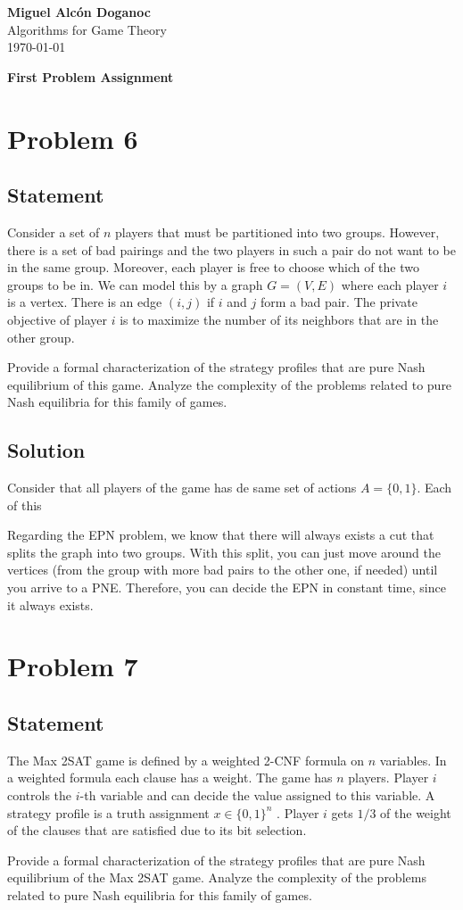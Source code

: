 \documentclass[a4paper, 10pt]{article}
\begin{document}
\noindent
\begin{flushright}
    \large\textbf{Miguel Alcón Doganoc} \\
    Algorithms for Game Theory \\
    \today
\end{flushright}

\noindent
{\huge{\textbf{First Problem Assignment}}}

\section*{Problem 6}
{\color{statement} 
\subsection*{Statement}
Consider a set of $n$ players that must be partitioned into two groups. However, there is a set of bad pairings and the two players in such a pair do not want to be in the same group. Moreover, each player is free to choose which of the two groups to be in. We can model this by a graph $G = (V, E)$ where each player $i$ is a vertex. There is an edge $(i, j)$ if $i$ and $j$ form a bad pair. The private objective of player $i$ is to maximize the number of its neighbors that are in the other group.

Provide a formal characterization of the strategy profiles that are pure Nash equilibrium of this game. Analyze the complexity of the problems related to pure Nash equilibria for this family of games.}

\subsection*{Solution}
Consider that all players of the game has de same set of actions $A = \{0,1\}$. Each of this

Regarding the EPN problem, we know that there will always exists a cut that splits the graph into two groups. With this split, you can just move around the vertices (from the group with more bad pairs to the other one, if needed) until you arrive to a PNE. Therefore, you can decide the EPN in constant time, since it always exists.

\section*{Problem 7}
{\color{statement} 
\subsection*{Statement}
The Max 2SAT game is defined by a weighted 2-CNF formula on $n$ variables. In a weighted formula each clause has a weight. The game has $n$ players. Player $i$ controls the $i$-th variable and can decide the value assigned to this variable. A strategy profile is a truth assignment $x \in \{0, 1\}^n$ . Player $i$ gets $1/3$ of the weight of the clauses that are satisfied due to its bit selection.

Provide a formal characterization of the strategy profiles that are pure Nash equilibrium of the Max 2SAT game. Analyze the complexity of the problems related to pure Nash equilibria for this family of games.}
\end{document}
